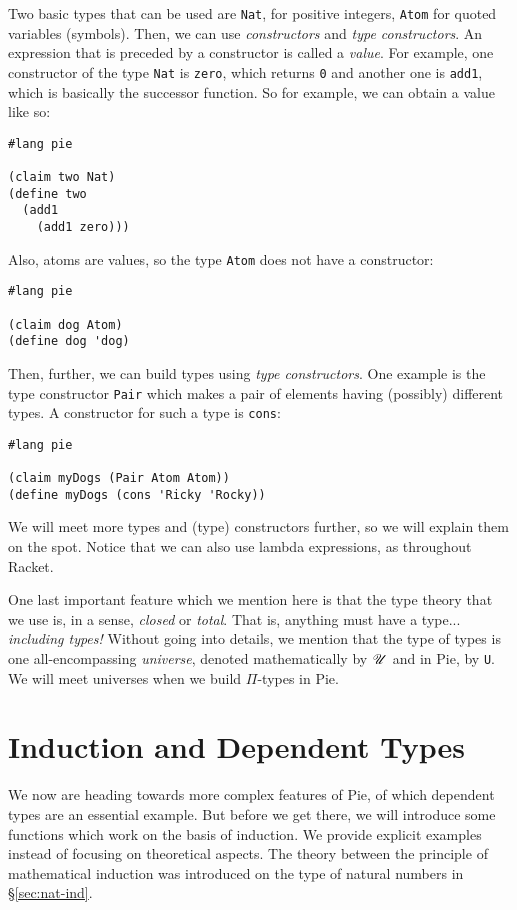 Two basic types that can be used are \texttt{Nat}, for positive integers,
\texttt{Atom} for quoted variables (symbols). Then, we can use
\emph{constructors} and \emph{type constructors}. An expression that is
preceded by a constructor is called a \emph{value}. For example, one constructor
of the type \texttt{Nat} is \texttt{zero}, which returns \texttt{0} and another
one is \texttt{add1}, which is basically the successor function. So for
example, we can obtain a value like so:
{
  \small
\begin{verbatim}
#lang pie

(claim two Nat)
(define two
  (add1
    (add1 zero)))
\end{verbatim}
}

Also, atoms are values, so the type \texttt{Atom} does not have a constructor:
{
  \small
\begin{verbatim}
#lang pie

(claim dog Atom)
(define dog 'dog)
\end{verbatim}
}

Then, further, we can build types using \emph{type constructors}. One example
is the type constructor \texttt{Pair} which makes a pair of elements having
(possibly) different types. A constructor for such a type is \texttt{cons}:
{
  \small
\begin{verbatim}
#lang pie

(claim myDogs (Pair Atom Atom))
(define myDogs (cons 'Ricky 'Rocky))
\end{verbatim}
}

We will meet more types and (type) constructors further, so we will explain
them on the spot. Notice that we can also use lambda expressions, as
throughout Racket.

One last important feature which we mention here is that the type theory that
we use is, in a sense, \emph{closed} or \emph{total}. That is, anything must
have a type... \emph{including types!} Without going into details, we mention
that the type of types is one all-encompassing \emph{universe}, denoted
mathematically by $ \mathscr{U} $ and in Pie, by \texttt{U}. We will meet universes
when we build $ \Pi $-types in Pie.

\section{Induction and Dependent Types}

We now are heading towards more complex features of Pie, of which
dependent types are an essential example. But before we get there,
we will introduce some functions which work on the basis of induction.
We provide explicit examples instead of focusing on theoretical aspects.
The theory between the principle of mathematical induction was
introduced on the type of natural numbers in \S\ref{sec:nat-ind}.


